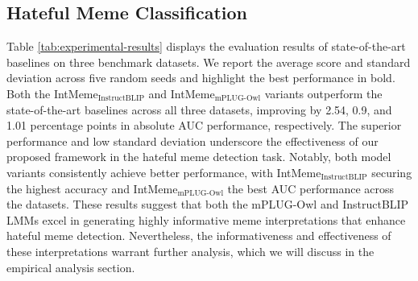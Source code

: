 \subsection{Hateful Meme Classification} 

Table \ref{tab:experimental-results} displays the evaluation results of state-of-the-art baselines on three benchmark datasets. We report the average score and standard deviation across five random seeds and highlight the best performance in bold. Both the IntMeme$_\text{InstructBLIP}$ and IntMeme$_\text{mPLUG-Owl}$ variants outperform the state-of-the-art baselines across all three datasets, improving by 2.54, 0.9, and 1.01 percentage points in absolute AUC performance, respectively. The superior performance and low standard deviation underscore the effectiveness of our proposed framework in the hateful meme detection task. Notably, both model variants consistently achieve better performance, with IntMeme$_\text{InstructBLIP}$ securing the highest accuracy and IntMeme$_\text{mPLUG-Owl}$ the best AUC performance across the datasets. These results suggest that both the mPLUG-Owl and InstructBLIP LMMs excel in generating highly informative meme interpretations that enhance hateful meme detection. Nevertheless, the informativeness and effectiveness of these interpretations warrant further analysis, which we will discuss in the empirical analysis section.



